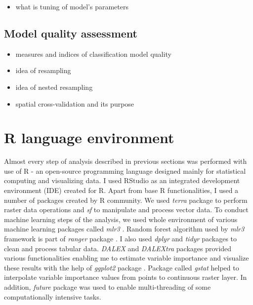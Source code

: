 \documentclass{amuthesis}
\begin{document}
\begin{itemize}
\tightlist
\item
  what is tuning of model's parameters
\end{itemize}

\hypertarget{sec-resampling}{%
\subsection{Model quality assessment}\label{sec-resampling}}

\begin{itemize}
\item
  measures and indices of classification model quality
\item
  idea of resampling
\item
  idea of nested resampling
\item
  spatial cross-validation and its purpose
\end{itemize}

\hypertarget{sec-r}{%
\section{R language environment}\label{sec-r}}

Almost every step of analysis described in previous sections was
performed with use of R \autocite{R-base} - an open-source programming
language designed mainly for statistical computing and visualizing data.
I used RStudio \autocite{rstudio_team_rstudio_2020} as an integrated
development environment (IDE) created for R. Apart from base R
functionalities, I used a number of packages created by R community. We
used \emph{terra} package \autocite{R-terra} to perform raster data
operations and \emph{sf} \autocite{R-sf} to manipulate and process
vector data. To conduct machine learning steps of the analysis, we used
whole environment of various machine learning packages called
\emph{mlr3} \autocite{R-mlr3}. Random forest algorithm used by
\emph{mlr3} framework is part of \emph{ranger} package
\autocite{R-ranger} . I also used \emph{dplyr} \autocite{R-dplyr} and
\emph{tidyr} packages \autocite{R-tidyr} to clean and process tabular
data. \emph{DALEX} \autocite{R-DALEX} and \emph{DALEXtra}
\autocite{R-DALEXtra} packages provided various functionalities enabling
me to estimate variable importance and visualize these results with the
help of \emph{ggplot2} package \autocite{R-ggplot2}. Package called
\emph{gstat} \autocite{R-gstat} helped to interpolate variable
importance values from points to continuous raster layer. In addition,
\emph{future} package \autocite{R-future} was used to enable
multi-threading of some computationally intensive tasks.
\end{document}
